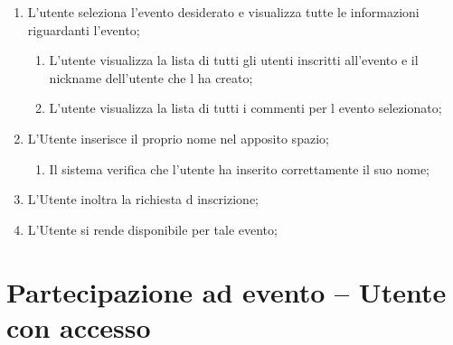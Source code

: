 \begin{enumerate}
\item L'utente seleziona l'evento desiderato e visualizza tutte le informazioni riguardanti l'evento;
\begin{enumerate}
\item L'utente visualizza la lista di tutti gli utenti inscritti all'evento e il nickname dell'utente che l ha creato;
\item L'utente visualizza la lista di tutti i commenti per l evento selezionato;
\end{enumerate}
\item L'Utente inserisce il proprio nome nel apposito spazio;
\begin{enumerate}
\item Il sistema verifica che l'utente ha inserito correttamente il suo nome;
\end{enumerate}
\item L'Utente inoltra la richiesta d inscrizione;
\item L'Utente si rende disponibile per tale evento;
\end{enumerate}

\section{Partecipazione ad evento – Utente con accesso }

